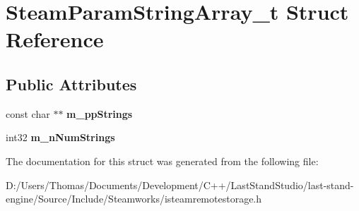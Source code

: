 \hypertarget{structSteamParamStringArray__t}{}\section{Steam\+Param\+String\+Array\+\_\+t Struct Reference}
\label{structSteamParamStringArray__t}
\subsection*{Public Attributes}
\begin{DoxyCompactItemize}
\item 
\hypertarget{structSteamParamStringArray__t_a903246c59099118e6b1dc1468973190a}{}const char $\ast$$\ast$ {\bfseries m\+\_\+pp\+Strings}\label{structSteamParamStringArray__t_a903246c59099118e6b1dc1468973190a}

\item 
\hypertarget{structSteamParamStringArray__t_a77491c6860983c576e2018e8336b0923}{}int32 {\bfseries m\+\_\+n\+Num\+Strings}\label{structSteamParamStringArray__t_a77491c6860983c576e2018e8336b0923}

\end{DoxyCompactItemize}


The documentation for this struct was generated from the following file\+:\begin{DoxyCompactItemize}
\item 
D\+:/\+Users/\+Thomas/\+Documents/\+Development/\+C++/\+Last\+Stand\+Studio/last-\/stand-\/engine/\+Source/\+Include/\+Steamworks/isteamremotestorage.\+h\end{DoxyCompactItemize}
